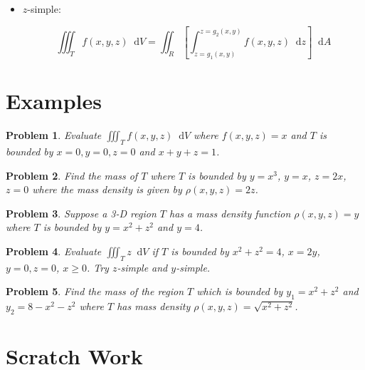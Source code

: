 \documentclass[11pt]{article}
\newtheorem{problem}{Problem}
\newcommand*\dif{\mathop{}\!\mathrm{d}}
\begin{document}
\begin{enumerate}
\begin{itemize}
    \begin{equation*}
        \iiint_T f(x,y,z) \dif{V} = \iint_R \left[\int_{y = g_1(x,z)}^{y=g_2(x,z)} f(x,y,z) \dif{y} \right]\dif{A}
    \end{equation*}

            \item $z$-simple:
    
    \begin{equation*}
        \iiint_T f(x,y,z) \dif{V} = \iint_R \left[\int_{z = g_1(x,y)}^{z=g_2(x,y)} f(x,y,z) \dif{z} \right] \dif{A}
    \end{equation*}
\end{itemize}







\end{enumerate}




\section{Examples}

\begin{problem}
    Evaluate $\iiint_T f(x,y,z) \dif{V}$ where $f(x,y,z) = x$ and $T$ is bounded by $x=0,y=0,z=0$ and $x+y+z=1$.
\end{problem}




\vspace{11.5cm}

\begin{problem}
Find the mass of $T$ where $T$ is bounded by $y=x^3$, $y=x$, $z=2x$, $z=0$ where the mass density is given by $\rho(x,y,z) = 2z$.
\end{problem}

\vspace{9.5cm}


\begin{problem}
    Suppose a 3-D region $T$ has a mass density function $\rho(x,y,z) = y$ where $T$ is bounded by $y=x^2+z^2$ and $y=4$. 
\end{problem}

\vspace{9.5cm}


\begin{problem}
    Evaluate $\iiint_T z \dif{V}$ if $T$ is bounded by $x^2+z^2 = 4$, $x=2y$, $y=0,z=0$, $x\geq 0$. Try $z$-simple and $y$-simple.
\end{problem}

\vspace{9.5cm}


\begin{problem}
 Find the mass of the region $T$ which is bounded by $y_1 = x^2 + z^2$ and $y_2 = 8-x^2-z^2$  where $T$ has mass density $\rho(x,y,z) = \sqrt{x^2+z^2}$.
\end{problem}


\newpage

\section{Scratch Work}
\end{document}
